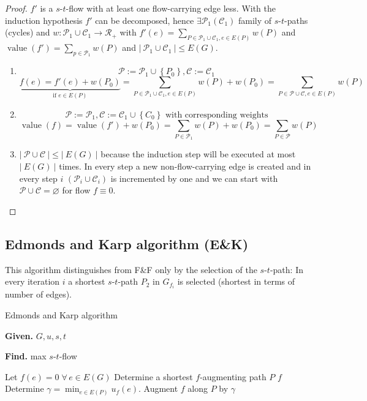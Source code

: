 \documentclass{article}
\newcommand{\card}[1]{\left|\:\!#1\:\!\right|}
\newcommand{\set}[1]{\left\{#1\right\}}
\newcommand{\given}[1]{\textbf{Given.} #1\par}
\newcommand{\find}[1]{\textbf{Find.} #1\par}
\newcommand{\gath}[2]{$#1$-$#2$-path} %
\newcommand{\flow}[2]{$#1$-$#2$-flow}
\newcommand{\fall}{\;\forall\,}
\begin{document}
\begin{proof}
  $f'$ is a \flow st with at least one flow-carrying edge less.
  With the induction hypothesis $f'$ can be decomposed, hence $\exists \mathcal{P}_1(\mathcal{C}_1)$ family of \gath sts (cycles) and $w: \mathcal{P}_1 \cup \mathcal{C}_1 \rightarrow \mathcal{R}_+$ with $f'(e) = \sum_{P \in \mathcal{P}_1 \cup \mathcal{C}_1, e \in E(P)} w(P)$ and $\operatorname{value}(f') = \sum_{p \in \mathcal{P}_1} w(P)$ and $\card{\mathcal{P}_1 \cup \mathcal{C}_1} \leq E(G)$.

  \begin{enumerate}
    \item
      \[
        \mathcal{P} := \mathcal{P}_1 \cup \set{P_0}, \mathcal{C} := \mathcal{C_1}
      \] \[
        \underbrace{f(e) = f'(e) + w(P_0)}_{\text{if } e \in E(P)}
          = \sum_{P \in \mathcal{P}_1 \cup \mathcal{C}_1, e \in E(P)} w(P) + w(P_0)
          = \sum_{P \in \mathcal{P} \cup \mathcal{C}, e \in E(P)} w(P)
      \]
    \item
      \[
        \mathcal{P} := \mathcal{P}_1, \mathcal{C}
          := \mathcal{C_1} \cup \set{C_0} \text{ with corresponding weights}
      \] \[
        \operatorname{value}(f) = \operatorname{value}(f') + w(P_0)
          = \sum_{P \in \mathcal{P}_1} w(P) + w(P_0)
          = \sum_{P \in \mathcal{P}} w(P)
      \]
    \item
      $\card{\mathcal{P} \cup \mathcal{C}} \leq \card{E(G)}$ because the induction step will be executed at most $\card{E(G)}$ times. In every step a new non-flow-carrying edge is created and in every step $i$ $(\mathcal{P}_i \cup \mathcal{C}_i)$ is incremented by one and we can start with $\mathcal{P} \cup \mathcal{C} = \diameter$ for flow $f \equiv 0$.
  \end{enumerate}
\end{proof}

\subsection[Edmonds and Karp algorithm]{Edmonds and Karp algorithm (E\&K)}
\label{ch-4.3}
%
This algorithm distinguishes from F\&F only by the selection of the \gath st: In every iteration $i$ a shortest \gath st $P_2$ in $G_{f_i}$ is selected (shortest in terms of number of edges).

\begin{algorithm}
  \caption{Edmonds and Karp algorithm}
  \label{ek-algo}
  \given{$G, u, s, t$}
  \find{max \flow st}
\begin{algorithmic}[1]
  \State Let $f(e) = 0 \fall e \in E(G)$
  \State Determine a shortest $f$-augmenting path $P$
    \label{ek-step-redo}
    \State \Return $f$
  \EndIf
  \State
    Determine $\gamma = \min_{e \in E(P)} u_f(e)$.
    Augment $f$ along $P$ by $\gamma$
  \State {}
\end{algorithmic}
\end{algorithm}
\end{document}
